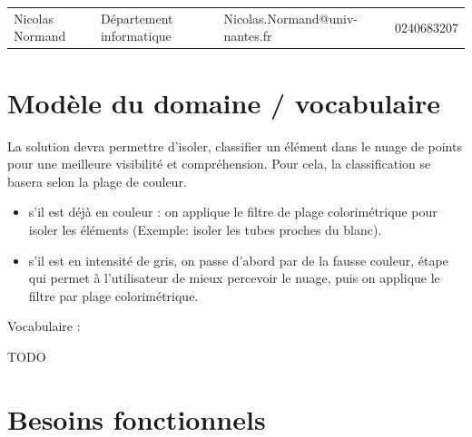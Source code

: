 \documentclass[12pt,titlepage,french]{article}
\begin{document}
\noindent\begin{tabu} to \textwidth {X[c2]X[c2]X[c3]X[c]}\toprule
     &&                       &\\\toprule
Nicolas Normand& Département informatique&Nicolas.Normand@univ-nantes.fr&    0240683207\\\bottomrule
\end{tabu}

\section{Modèle du domaine / vocabulaire}

La solution devra permettre d’isoler, classifier un élément dans le nuage de points pour une meilleure visibilité et compréhension. Pour cela, la classification se basera selon la plage de couleur.
\begin{itemize}
	\item  s'il est déjà en couleur : on applique le filtre de plage colorimétrique pour isoler les éléments (Exemple: isoler les tubes proches du blanc).\par

	\item  s'il est en intensité de gris, on passe d'abord par de la fausse couleur, étape qui permet à l'utilisateur de mieux percevoir le nuage, puis on applique le filtre par plage colorimétrique.\par

\end{itemize}

Vocabulaire :

TODO

\section{Besoins fonctionnels}
\end{document}
